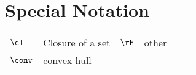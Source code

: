 \section{Special Notation}

\begin{tabularx}{\textwidth}{XlrXlr}
	$ \cl $ & Closure of a set & $ \rH $ & other \\
	$ \conv $ & convex hull
\end{tabularx}